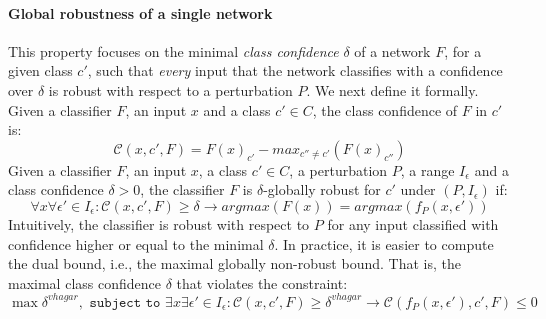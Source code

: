 \documentclass[11pt]{article}
\begin{document}
\paragraph{Global robustness of a single network}
This property focuses on the minimal \emph{class confidence} $\delta$ of a network $F$, for a given class $c'$, such that \emph{every} input that the network classifies with a confidence over $\delta$ is robust with respect to a perturbation $P$. We next define it formally.
Given a classifier $F$, an input $x$ and a class $c'\in{C}$, the class confidence of $F$ in $c'$ is:
$$\mathcal{C}(x,c',F)=F(x)_{c'}-max_{c''\ne c'}(F(x)_{c''})$$
Given a classifier $F$, an input $x$, a class $c'\in{C}$, a perturbation $P$, a range $I_\epsilon$ and a class confidence $\delta>0$, the classifier $F$ is $\delta$-globally robust for $c'$ under $(P,I_\epsilon)$ if:\\
$$\forall{x}\forall{\epsilon'}\in{I_\epsilon}:    \mathcal{C}(x,c',F) \geq \delta \rightarrow argmax(F(x)) = argmax(f_P(x,\epsilon')) $$
Intuitively, the classifier is robust with respect to $P$ for any input classified with confidence higher or equal to the minimal $\delta$. In practice, it is easier to compute the dual bound, i.e., the maximal globally non-robust bound. That is, the maximal class confidence $\delta$ that violates the constraint:
$$\max{\delta^{vhagar}}, \texttt{ subject to } \exists{x}\exists{\epsilon'}\in{I_\epsilon}: \mathcal{C}(x,c',F) \geq \delta^{vhagar} \rightarrow \mathcal{C}(f_P(x,\epsilon'),c',F)\leq 0$$ 
\end{document}
